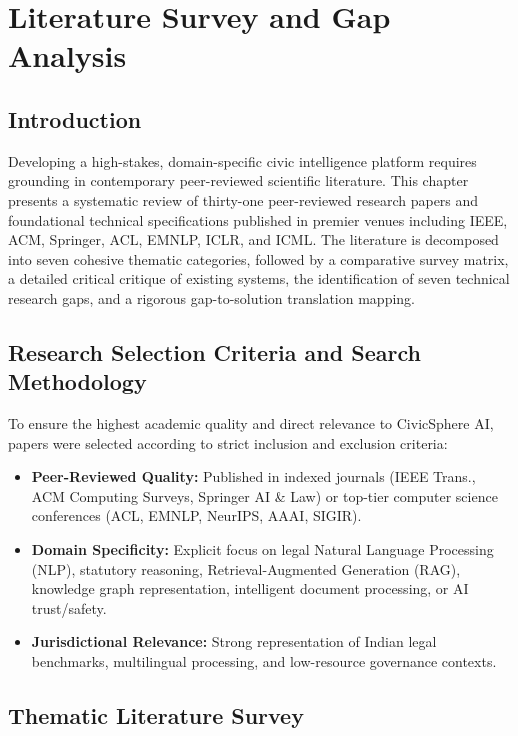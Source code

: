 \chapter{Literature Survey and Gap Analysis}
\label{ch:literature_survey}

\section{Introduction}
\label{sec:lit_intro}
Developing a high-stakes, domain-specific civic intelligence platform requires grounding in contemporary peer-reviewed scientific literature. This chapter presents a systematic review of thirty-one peer-reviewed research papers and foundational technical specifications published in premier venues including IEEE, ACM, Springer, ACL, EMNLP, ICLR, and ICML. The literature is decomposed into seven cohesive thematic categories, followed by a comparative survey matrix, a detailed critical critique of existing systems, the identification of seven technical research gaps, and a rigorous gap-to-solution translation mapping.

\section{Research Selection Criteria and Search Methodology}
\label{sec:selection_criteria}
To ensure the highest academic quality and direct relevance to CivicSphere AI, papers were selected according to strict inclusion and exclusion criteria:
\begin{itemize}
    \item \textbf{Peer-Reviewed Quality:} Published in indexed journals (IEEE Trans., ACM Computing Surveys, Springer AI \& Law) or top-tier computer science conferences (ACL, EMNLP, NeurIPS, AAAI, SIGIR).
    \item \textbf{Domain Specificity:} Explicit focus on legal Natural Language Processing (NLP), statutory reasoning, Retrieval-Augmented Generation (RAG), knowledge graph representation, intelligent document processing, or AI trust/safety.
    \item \textbf{Jurisdictional Relevance:} Strong representation of Indian legal benchmarks, multilingual processing, and low-resource governance contexts.
\end{itemize}

\section{Thematic Literature Survey}
\label{sec:thematic_survey}

